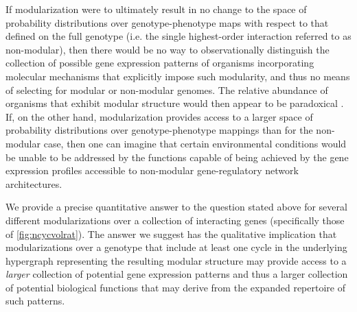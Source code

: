 If modularization were to ultimately result in no change to the space of probability distributions over genotype-phenotype maps with respect to that defined on the full genotype (i.e. the single highest-order interaction referred to as non-modular), then there would be no way to observationally distinguish the collection of possible gene expression patterns of organisms incorporating molecular mechanisms that explicitly impose such modularity, and thus no means of selecting for modular or non-modular genomes. The relative abundance of organisms that exhibit modular structure would then appear to be paradoxical \cite{Jothi2009,Colm}. If, on the other hand, modularization provides access to a larger space of probability distributions over genotype-phenotype mappings than for the non-modular case, then one can imagine that certain environmental conditions would be unable to be addressed by the functions capable of being achieved by the gene expression profiles accessible to non-modular gene-regulatory network architectures.

We provide a precise quantitative answer to the question stated above for several different modularizations over a collection of interacting genes (specifically those of \ref{fig:ncycvolrat}). The answer we suggest has the qualitative implication that modularizations over a genotype that include at least one cycle in the underlying hypergraph representing the resulting modular structure may provide access to a \emph{larger} collection of potential gene expression patterns and thus a larger collection of potential biological functions that may derive from the expanded repertoire of such patterns.
